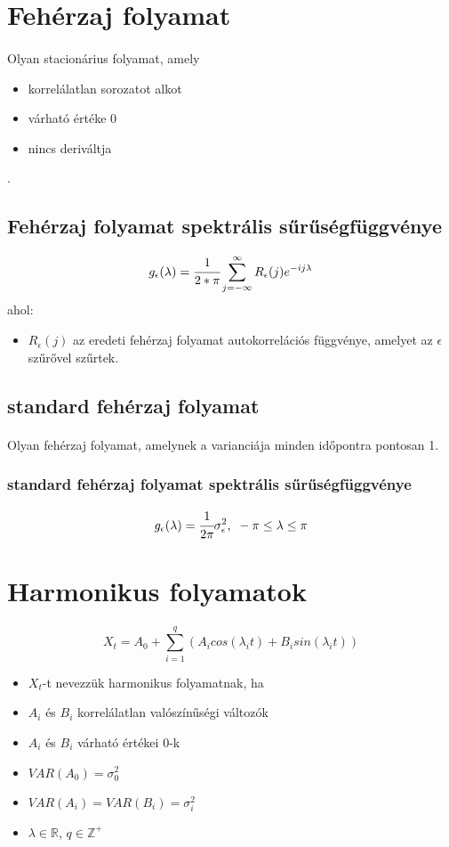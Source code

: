 \documentclass[11pt,a4paper]{article}
\begin{document}
		\section{Fehérzaj folyamat}
			\paragraph{}
				Olyan stacionárius folyamat, amely
				\begin{itemize}
					\item korrelálatlan sorozatot alkot
					\item várható értéke 0
					\item nincs deriváltja
				\end{itemize}.
			\subsection{Fehérzaj folyamat spektrális sűrűségfüggvénye}
				$$g_\epsilon (\lambda) = \cfrac{1}{2* \pi} \sum_{j = - \infty}^{\infty} R_{\epsilon}(j)e^{-i j \lambda}$$
				ahol:
				\begin{itemize}
					\item $R_\epsilon(j)$ az eredeti fehérzaj folyamat autokorrelációs függvénye, amelyet az $\epsilon$ szűrővel szűrtek.
				\end{itemize}
			\subsection{standard fehérzaj folyamat}
				\paragraph{}
					Olyan fehérzaj folyamat, amelynek a varianciája minden időpontra pontosan 1.
			\subsubsection{standard fehérzaj folyamat spektrális sűrűségfüggvénye}
				$$g_\epsilon(\lambda) = \cfrac{1}{2 \pi} \sigma^2_\epsilon, \\\ -\pi \le \lambda \le \pi$$
		\section{Harmonikus folyamatok}
			\paragraph{}
				$$X_t = A_0 + \sum_{i=1}^q (A_i cos(\lambda_i t) + B_i sin(\lambda_i t))$$
				\begin{itemize}
					\item $X_t$-t nevezzük harmonikus folyamatnak, ha
					\item $A_i$ és $B_i$ korrelálatlan valószínűségi változók
					\item $A_i$ és $B_i$ várható értékei 0-k
					\item $VAR(A_0) = \sigma_0^2$
					\item $VAR(A_i)= VAR(B_i) = \sigma_i^2$
					\item $\lambda \in \mathbb{R}$, $q \in \mathbb{Z}^+$
				\end{itemize}
\end{document}
